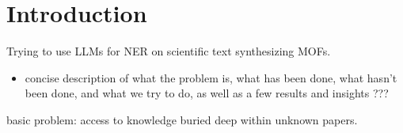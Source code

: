 \chapter{Introduction}\label{chap:introduction}

Trying to use \glspl{LLM} for \gls{NER} on scientific text synthesizing \glspl{MOF}.

\begin{itemize}
    \item concise description of what the problem is, what has been done, what hasn't been done, and what we try to do, as well as a few results and insights ???
\end{itemize}

basic problem: access to knowledge buried deep within unknown papers.



